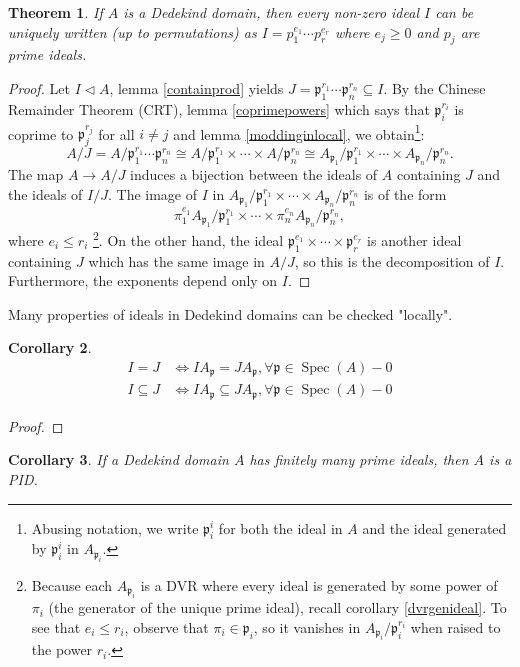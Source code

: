 \documentclass{tufte-handout} %
\newtheorem{thm}{Theorem}
\newtheorem{cor}[thm]{Corollary}
\theoremstyle{definition}
\theoremstyle{remark}
\newcommand{\lp}{{\mathfrak{p}}}
\DeclareMathOperator{\spec}{Spec}
\begin{document}
\begin{thm}
	If $A$ is a Dedekind domain, then every non-zero ideal $I$ can be uniquely written (up to permutations) as $I= p_1^{e_1}\cdots p_r^{e_r}$ where $e_j \geq 0$ and $p_j$ are prime ideals.
\end{thm}
\begin{proof}
	Let $I \lhd A$, lemma \ref{containprod} yields $J = \lp_1^{r_1} \cdots \lp_n^{r_n} \subseteq I$. By the Chinese Remainder Theorem (CRT), lemma \ref{coprimepowers} which says that $\lp_i^{r_i}$ is coprime to $\lp_j^{r_j}$ for all $i\neq j$ and lemma \ref{moddinginlocal}, we obtain\footnote{Abusing notation, we write $\lp_i^i$ for both the ideal in $A$ and the ideal generated by $\lp_i^i$ in $A_{\lp_i}$.}:
	\[A/J = A/\lp_1^{r_1} \cdots \lp_n^{r_n} \cong A/\lp_1^{r_1} \times \cdots \times A/\lp_n^{r_n} \cong A_{\lp_1}/\lp_1^{r_1} \times \cdots \times A_{\lp_n}/\lp_n^{r_n}.\]
	The map $A\rightarrow A/J$ induces a bijection between the ideals of $A$ containing $J$ and the ideals of $I/J$. The image of $I$ in $A_{\lp_1}/\lp_1^{r_1}\times \cdots \times A_{\lp_n}/\lp_n^{r_n}$ is of the form \[\pi_1^{e_1}A_{\lp_1}/\lp_1^{r_1}\times \cdots \times \pi_n^{e_n}A_{\lp_n}/\lp_n^{r_n},\] where $e_i \leq r_i$ \footnote{Because each $A_{\lp_i}$ is a DVR where every ideal is generated by some power of $\pi_i$ (the generator of the unique prime ideal), recall corollary \ref{dvrgenideal}. To see that $e_i \leq r_i$, observe that $\pi_i \in \lp_i$, so it vanishes in $A_{\lp_i}/\lp_i^{r_i}$ when raised to the power $r_i$.}. On the other hand, the ideal $\lp_1^{e_1} \times \cdots \times \lp_r^{e_r}$ is another ideal containing $J$ which has the same image in $A/J$, so this is the decomposition of $I$. Furthermore, the exponents depend only on $I$.
\end{proof}
Many properties of ideals in Dedekind domains can be checked "locally".
\begin{cor}
	\begin{align*}
		I = J &\Leftrightarrow IA_{\lp} = JA_{\lp}, \forall \lp \in \spec(A)-0\\
		I \subseteq J &\Leftrightarrow IA_{\lp} \subseteq JA_{\lp}, \forall \lp \in \spec(A) - 0
	\end{align*}
\end{cor}
\begin{proof}
\end{proof}
\begin{cor}
	If a Dedekind domain $A$ has finitely many prime ideals, then $A$ is a PID.
\end{cor}
\end{document}
